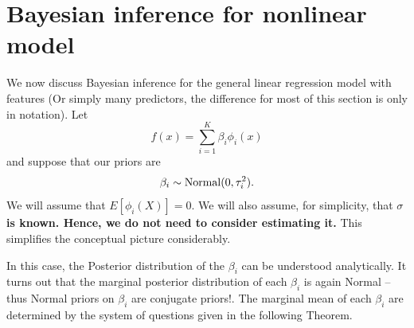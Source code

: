 \section{Bayesian inference for nonlinear model}
  We now discuss Bayesian inference for the general linear regression model with features (Or simply many predictors, the difference for most of this section is only in notation). Let
\begin{equation*}
f(x) = \sum_{i=1}^K\beta_i\phi_i(x)
\end{equation*}
and suppose that our priors are 
\begin{equation*}
\beta_i \sim {\rm Normal}(0,\tau_i^2).
\end{equation*}
We will assume that $E[\phi_i(X)]=0$. We will also assume, for simplicity, that {\bf $\sigma$ is known. Hence, we do not need to consider estimating it.} This simplifies the conceptual picture considerably. 

 In this case, the Posterior distribution of the $\beta_i$ can be understood analytically. It turns out that the marginal posterior distribution of each $\beta_i$ is again Normal -- thus Normal priors on $\beta_i$ are conjugate priors!. The marginal mean of each $\beta_i$ are determined by the system of questions given in the following Theorem. 


